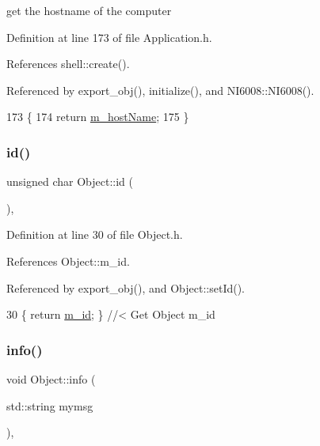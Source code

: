 get the hostname of the computer 

Definition at line 173 of file Application.\+h.



References shell\+::create().



Referenced by export\+\_\+obj(), initialize(), and N\+I6008\+::\+N\+I6008().


\begin{DoxyCode}
173                       \{
174     \textcolor{keywordflow}{return} \hyperlink{classApplication_a20094c2bf311e2046942eeeec4a11f02}{m\_hostName};
175   \}
\end{DoxyCode}
\mbox{\label{classObject_af99145335cc61ff6e2798ea17db009d2}} 
\subsubsection{\texorpdfstring{id()}{id()}}
{\footnotesize\ttfamily unsigned char Object\+::id (\begin{DoxyParamCaption}{ }\end{DoxyParamCaption})\hspace{0.3cm}{\ttfamily [inline]}, {\ttfamily [inherited]}}



Definition at line 30 of file Object.\+h.



References Object\+::m\+\_\+id.



Referenced by export\+\_\+obj(), and Object\+::set\+Id().


\begin{DoxyCode}
30 \{ \textcolor{keywordflow}{return} \hyperlink{classObject_aca74b9dbfed7b5556ea2d56c65b6b6b0}{m\_id};         \} \textcolor{comment}{//< Get Object m\_id }
\end{DoxyCode}
\mbox{\label{classObject_a644fd329ea4cb85f54fa6846484b84a8}} 
\subsubsection{\texorpdfstring{info()}{info()}\hspace{0.1cm}{\footnotesize\ttfamily [1/2]}}
{\footnotesize\ttfamily void Object\+::info (\begin{DoxyParamCaption}\item[{std\+::string}]{mymsg }\end{DoxyParamCaption})\hspace{0.3cm}{\ttfamily [inline]}, {\ttfamily [inherited]}}



